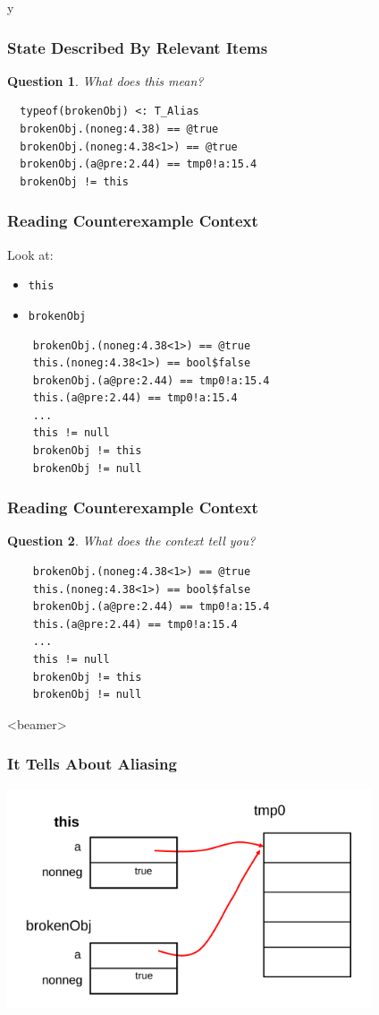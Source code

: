 \if y\MAKEHANDOUTS \documentclass[t,compress,landscape,handout]{beamer}
\newtheorem*{question}{Question}
\begin{document}
\begin{frame}[fragile]
\frametitle{State Described By Relevant Items}

\begin{question}
What does this mean?

\begin{verbatim}
  typeof(brokenObj) <: T_Alias
  brokenObj.(noneg:4.38) == @true
  brokenObj.(noneg:4.38<1>) == @true
  brokenObj.(a@pre:2.44) == tmp0!a:15.4
  brokenObj != this
\end{verbatim}
\end{question}
\end{frame}

\begin{frame}[fragile]
\frametitle{Reading Counterexample Context}

Look at:
\begin{itemize}
\item
\lstinline!this!

\item
\lstinline!brokenObj!
\end{itemize}

\begin{verbatim}
    brokenObj.(noneg:4.38<1>) == @true
    this.(noneg:4.38<1>) == bool$false
    brokenObj.(a@pre:2.44) == tmp0!a:15.4
    this.(a@pre:2.44) == tmp0!a:15.4
    ...
    this != null
    brokenObj != this
    brokenObj != null
\end{verbatim}
\end{frame}

\begin{frame}[fragile]
\frametitle{Reading Counterexample Context}

\begin{question}
What does the context tell you?
\end{question}
\begin{verbatim}
    brokenObj.(noneg:4.38<1>) == @true
    this.(noneg:4.38<1>) == bool$false
    brokenObj.(a@pre:2.44) == tmp0!a:15.4
    this.(a@pre:2.44) == tmp0!a:15.4
    ...
    this != null
    brokenObj != this
    brokenObj != null
\end{verbatim}
\end{frame}

\begin{frame}<beamer>
\frametitle{It Tells About Aliasing}
\includegraphics[width=4.25in]{alias-brokenobj}
\end{frame}
\end{document}

